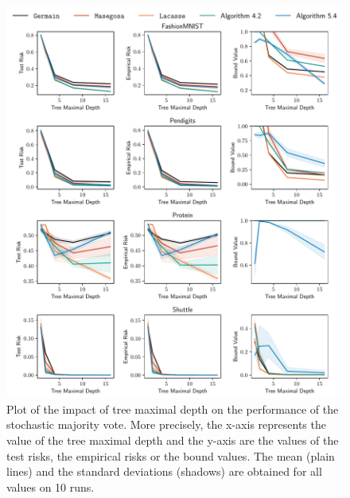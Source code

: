 \begin{noaddcontents}
\begin{figure}
    \centering
    \includegraphics[width=\textwidth]{chapter_5/figures/depth_3.pdf}
    \caption{
    Plot of the impact of tree maximal depth on the performance of the stochastic majority vote.
    More precisely, the x-axis represents the value of the tree maximal depth and the y-axis are the values of the test risks, the empirical risks or the bound values.
    The mean (plain lines) and the standard deviations (shadows) are obtained for all values on 10 runs.
    }
    \label{ap:mv-sto:fig:depth-3}
\end{figure}


\end{noaddcontents}
